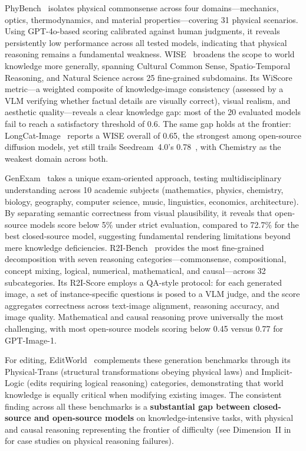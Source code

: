 PhyBench~\citep{meng2024phybench} isolates physical commonsense across four domains---mechanics, optics, thermodynamics, and material properties---covering 31 physical scenarios. Using GPT-4o-based scoring calibrated against human judgments, it reveals persistently low performance across all tested models, indicating that physical reasoning remains a fundamental weakness. WISE~\citep{niu2025wise} broadens the scope to world knowledge more generally, spanning Cultural Common Sense, Spatio-Temporal Reasoning, and Natural Science across 25 fine-grained subdomains. Its WiScore metric---a weighted composite of knowledge-image consistency (assessed by a VLM verifying whether factual details are visually correct), visual realism, and aesthetic quality---reveals a clear knowledge gap: most of the 20 evaluated models fail to reach a satisfactory threshold of 0.6. The same gap holds at the frontier: LongCat-Image~\citep{team2025longcat} reports a WISE overall of 0.65, the strongest among open-source diffusion models, yet still trails Seedream~4.0's 0.78~\citep{seedream2025seedream}, with Chemistry as the weakest domain across both.

GenExam~\citep{GenExam} takes a unique exam-oriented approach, testing multidisciplinary understanding across 10 academic subjects (mathematics, physics, chemistry, biology, geography, computer science, music, linguistics, economics, architecture). By separating semantic correctness from visual plausibility, it reveals that open-source models score below 5\% under strict evaluation, compared to 72.7\% for the best closed-source model, suggesting fundamental rendering limitations beyond mere knowledge deficiencies. R2I-Bench~\citep{chen2025r2ibench} provides the most fine-grained decomposition with seven reasoning categories---commonsense, compositional, concept mixing, logical, numerical, mathematical, and causal---across 32 subcategories. Its R2I-Score employs a QA-style protocol: for each generated image, a set of instance-specific questions is posed to a VLM judge, and the score aggregates correctness across text-image alignment, reasoning accuracy, and image quality. Mathematical and causal reasoning prove universally the most challenging, with most open-source models scoring below 0.45 versus 0.77 for GPT-Image-1.

For editing, EditWorld~\citep{EditWorld} complements these generation benchmarks through its Physical-Trans (structural transformations obeying physical laws) and Implicit-Logic (edits requiring logical reasoning) categories, demonstrating that world knowledge is equally critical when modifying existing images. The consistent finding across all these benchmarks is a \textbf{substantial gap between closed-source and open-source models} on knowledge-intensive tasks, with physical and causal reasoning representing the frontier of difficulty (see Dimension~II in  for case studies on physical reasoning failures).



